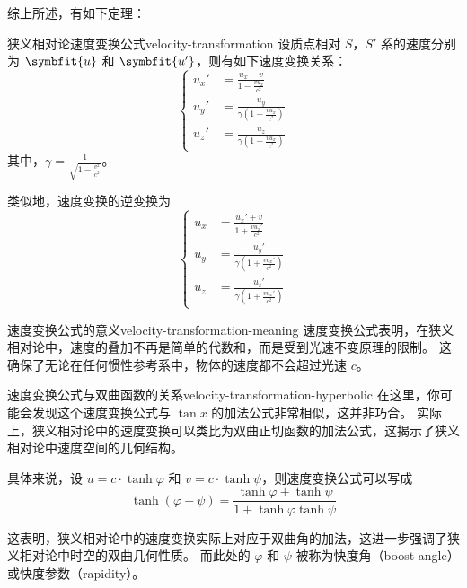 综上所述，有如下定理：
\begin{theorem}{狭义相对论速度变换公式}{velocity-transformation}
    设质点相对 $S$，$S'$ 系的速度分别为 $\symbfit{u}$ 和 $\symbfit{u'}$，则有如下速度变换关系：
    \begin{equation}
        \left\{
        \begin{aligned}
            u_x' & = \frac{u_x - v}{1 - \frac{v u_x}{c^2}}                 \\
            u_y' & = \frac{u_y}{\gamma \left(1 - \frac{v u_x}{c^2}\right)} \\
            u_z' & = \frac{u_z}{\gamma \left(1 - \frac{v u_x}{c^2}\right)}
        \end{aligned}
        \right.
    \end{equation}
    其中，$\gamma = \frac{1}{\sqrt{1 - \frac{v^2}{c^2}}}$。
\end{theorem}

类似地，速度变换的逆变换为
\begin{equation}
    \left\{
    \begin{aligned}
        u_x & = \frac{u_x' + v}{1 + \frac{v u_x'}{c^2}}                 \\
        u_y & = \frac{u_y'}{\gamma \left(1 + \frac{v u_x'}{c^2}\right)} \\
        u_z & = \frac{u_z'}{\gamma \left(1 + \frac{v u_x'}{c^2}\right)}
    \end{aligned}
    \right.
\end{equation}

\begin{note}{速度变换公式的意义}{velocity-transformation-meaning}
    速度变换公式表明，在狭义相对论中，速度的叠加不再是简单的代数和，而是受到光速不变原理的限制。
    这确保了无论在任何惯性参考系中，物体的速度都不会超过光速 $c$。
\end{note}

\begin{note}{速度变换公式与双曲函数的关系}{velocity-transformation-hyperbolic}
    在这里，你可能会发现这个速度变换公式与 $\tan x$ 的加法公式非常相似，这并非巧合。
    实际上，狭义相对论中的速度变换可以类比为双曲正切函数的加法公式，这揭示了狭义相对论中速度空间的几何结构。

    具体来说，设 $u = c \cdot \tanh \varphi$ 和 $v = c \cdot \tanh \psi$，则速度变换公式可以写成
    \begin{equation}
        \tanh(\varphi + \psi) = \frac{\tanh \varphi + \tanh \psi}{1 + \tanh \varphi \tanh \psi}
    \end{equation}

    这表明，狭义相对论中的速度变换实际上对应于双曲角的加法，这进一步强调了狭义相对论中时空的双曲几何性质。
    而此处的 $\varphi$ 和 $\psi$ 被称为快度角（boost angle）或快度参数（rapidity）。
\end{note}

